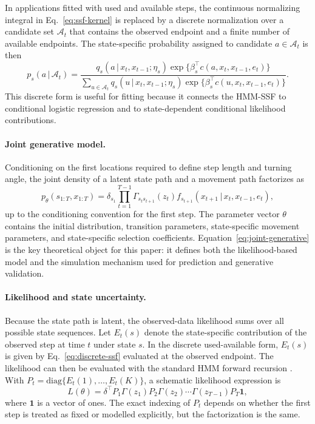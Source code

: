 \documentclass[11pt]{article}
\newcommand{\given}{\,\vert\,}
\begin{document}
In applications fitted with used and available steps, the continuous
normalizing integral in Eq.~\eqref{eq:ssf-kernel} is replaced by a discrete
normalization over a candidate set $\mathcal{A}_t$ that contains the observed
endpoint and a finite number of available endpoints. The state-specific
probability assigned to candidate $a \in \mathcal{A}_t$ is then
\begin{equation}
  p_s(a \given \mathcal{A}_t)
  =
  \frac{
    q_s(a \given x_t, x_{t-1}; \eta_s)
    \exp\{ \beta_s^\top c(a, x_t, x_{t-1}, e_t) \}
  }{
    \sum_{u \in \mathcal{A}_t}
    q_s(u \given x_t, x_{t-1}; \eta_s)
    \exp\{ \beta_s^\top c(u, x_t, x_{t-1}, e_t) \}
  }.
  \label{eq:discrete-ssf}
\end{equation}
This discrete form is useful for fitting because it connects the HMM-SSF to
conditional logistic regression and to state-dependent conditional likelihood
contributions.

\paragraph{Joint generative model.}

Conditioning on the first locations required to define step length and turning
angle, the joint density of a latent state path and a movement path factorizes
as
\begin{equation}
  p_{\theta}(s_{1:T}, x_{1:T})
  =
  \delta_{s_1}
  \prod_{t=1}^{T-1}
  \Gamma_{s_t s_{t+1}}(z_t)
  f_{s_{t+1}}(x_{t+1} \given x_t, x_{t-1}, e_t),
  \label{eq:joint-generative}
\end{equation}
up to the conditioning convention for the first step. The parameter vector
$\theta$ contains the initial distribution, transition parameters,
state-specific movement parameters, and state-specific selection coefficients.
Equation~\eqref{eq:joint-generative} is the key theoretical object for this
paper: it defines both the likelihood-based model and the simulation mechanism
used for prediction and generative validation.

\paragraph{Likelihood and state uncertainty.}

Because the state path is latent, the observed-data likelihood sums over all
possible state sequences. Let $E_t(s)$ denote the state-specific contribution
of the observed step at time $t$ under state $s$. In the discrete used-available
form, $E_t(s)$ is given by Eq.~\eqref{eq:discrete-ssf} evaluated at the
observed endpoint. The likelihood can then be evaluated with the standard HMM
forward recursion \citep{rabiner1989,langrock2012}. With
$P_t=\mathrm{diag}\{E_t(1),\ldots,E_t(K)\}$, a schematic likelihood expression
is
\begin{equation*}
  L(\theta)
  =
  \delta^\top P_1
  \Gamma(z_1) P_2
  \Gamma(z_2) \cdots
  \Gamma(z_{T-1}) P_T
  \mathbf{1},
\end{equation*}
where $\mathbf{1}$ is a vector of ones. The exact indexing of $P_t$ depends on
whether the first step is treated as fixed or modelled explicitly, but the
factorization is the same.
\end{document}
